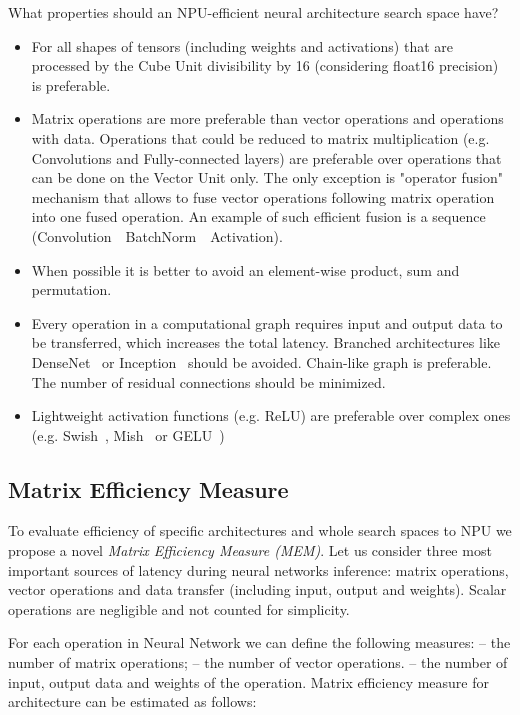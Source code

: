 \documentclass[letterpaper]{article}
\begin{document}
What properties should an NPU-efficient neural architecture search space have?
\begin{itemize}
\item For all shapes of tensors (including weights and activations) that are processed by the Cube Unit divisibility by 16 (considering float16 precision) is preferable.
\item Matrix operations are more preferable than vector operations and operations with data.
Operations that could be reduced to matrix multiplication (e.g. Convolutions and Fully-connected layers) are preferable over operations that can be done on the Vector Unit only.
The only exception is "operator fusion" mechanism that allows to fuse vector operations following matrix operation into one fused operation. An example of such efficient fusion is a sequence (Convolution~~BatchNorm~~Activation).

\item When possible it is better to avoid an element-wise product, sum and permutation.

\item Every operation in a computational graph requires input and output data to be transferred, which increases the total latency.
Branched architectures like DenseNet~\cite{huang2018densely} or Inception~\cite{szegedy2014going} should be avoided.
Chain-like graph is preferable. The number of residual connections should be minimized.
\item Lightweight activation functions (e.g. ReLU) are preferable over complex ones (e.g. Swish~\cite{ramachandran2017searching}, Mish~\cite{misra2020mish} or GELU~\cite{hendrycks2020gaussian})
\end{itemize}

\subsection{Matrix Efficiency Measure}

To evaluate efficiency of specific architectures and whole search spaces to NPU we propose a novel \textit{Matrix Efficiency Measure (MEM)}.
Let us consider three most important sources of latency during neural networks inference: matrix operations, vector operations and data transfer (including input, output and weights).
Scalar operations are negligible and not counted for simplicity.

For each operation  in Neural Network  we can define the following measures:  – the number of matrix operations;  – the number of vector operations.  – the number of input, output data and weights of the operation.
Matrix efficiency measure for architecture  can be estimated as follows:
\end{document}
